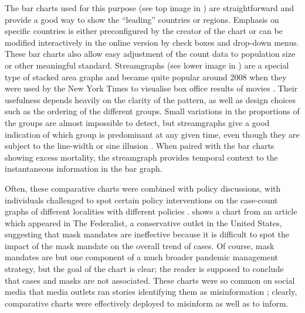 \documentclass[article]{jdssv}\usepackage[]{graphicx}\usepackage[]{color}
\begin{document}
The bar charts used for this purpose (see top image in ) are straightforward and provide a good way to show the ``leading'' countries or regions. Emphasis on specific countries is either preconfigured by the creator of the chart or can be modified interactively in the online version by check boxes and drop-down menus. These bar charts also allow easy adjustment of the count data to population size or other meaningful standard. Streamgraphs (see lower image in ) are a special type of stacked area graphs and became quite popular around 2008 when they were used by the New York Times to visualise box office results of movies \citep{streamgraph}. Their usefulness depends heavily on the clarity of the pattern, as well as design choices such as the ordering of the different groups. Small variations in the proportions of the groups are almost impossible to detect, but streamgraphs give a good indication of which group is predominant at any given time, even though they are subject to the line-width or sine illusion \citep{vanderplasSignsSineIllusion2015}. When paired with the bar charts showing excess mortality, the streamgraph provides temporal context to the instantaneous information in the bar graph.

Often, these comparative charts were combined with policy discussions, with individuals challenged to spot certain policy interventions on the case-count graphs of different localities with different policies \citep{weissThese12Graphs2020}.  shows a chart from an article which appeared in The Federalist, a conservative outlet in the United States, suggesting that mask mandates are ineffective because it is difficult to spot the impact of the mask mandate on the overall trend of cases. Of course, mask mandates are but one component of a much broader pandemic management strategy, but the goal of the chart is clear; the reader is supposed to conclude that cases and masks are not associated. These charts were so common on social media that media outlets ran stories identifying them as misinformation \citep{reutersstaffFactCheckMask2020}; clearly, comparative charts were effectively deployed to misinform as well as to inform.
\end{document}
